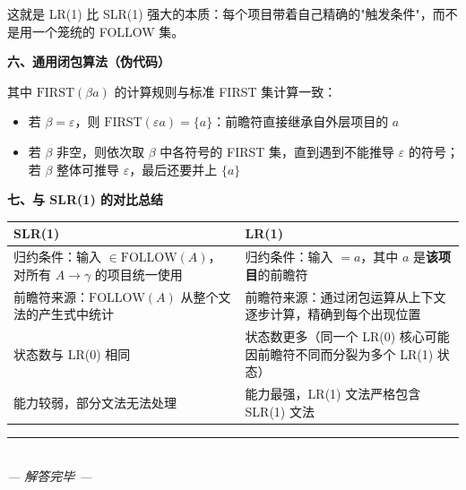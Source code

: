 \documentclass[12pt,a4paper,fontset=fandol]{ctexart}
\begin{document}
这就是 LR(1) 比 SLR(1) 强大的本质：每个项目带着自己精确的"触发条件"，而不是用一个笼统的 FOLLOW 集。

\textbf{六、通用闭包算法（伪代码）}

\begin{center}
\end{center}

其中 $\text{FIRST}(\beta a)$ 的计算规则与标准 FIRST 集计算一致：
\begin{itemize}
    \item 若 $\beta = \varepsilon$，则 $\text{FIRST}(\varepsilon a) = \{a\}$：前瞻符直接继承自外层项目的 $a$
    \item 若 $\beta$ 非空，则依次取 $\beta$ 中各符号的 FIRST 集，直到遇到不能推导 $\varepsilon$ 的符号；若 $\beta$ 整体可推导 $\varepsilon$，最后还要并上 $\{a\}$
\end{itemize}

\textbf{七、与 SLR(1) 的对比总结}

\begin{center}
\begin{tabular}{p{}|p{}}
\textbf{SLR(1)} & \textbf{LR(1)} \\
\hline
归约条件：输入 $\in \text{FOLLOW}(A)$，对所有 $A \to \gamma$ 的项目统一使用 & 归约条件：输入 $= a$，其中 $a$ 是\textbf{该项目}的前瞻符 \\
\hline
前瞻符来源：$\text{FOLLOW}(A)$ 从整个文法的产生式中统计 & 前瞻符来源：通过闭包运算从上下文逐步计算，精确到每个出现位置 \\
\hline
状态数与 LR(0) 相同 & 状态数更多（同一个 LR(0) 核心可能因前瞻符不同而分裂为多个 LR(1) 状态） \\
\hline
能力较弱，部分文法无法处理 & 能力最强，LR(1) 文法严格包含 SLR(1) 文法 \\
\end{tabular}
\end{center}


\vfill
\begin{center}
\rule{0.3\textwidth}{0.4pt} \\
\textit{--- 解答完毕 ---}
\end{center}
\end{document}

